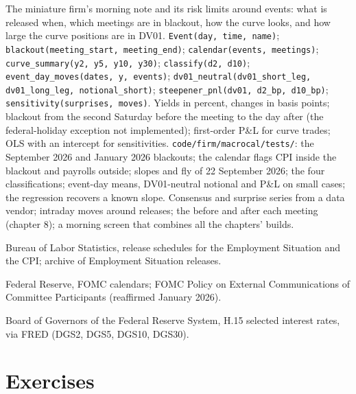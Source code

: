 \begin{build}
 The miniature firm's morning note and its risk limits around events: what
is released when, which meetings are in blackout, how the curve looks, and how large the
curve positions are in DV01.
 \texttt{Event(day, time, name)}; \texttt{blackout(meeting\_start,
meeting\_end)}; \texttt{calendar(events, meetings)}; \texttt{curve\_summary(y2, y5, y10,
y30)}; \texttt{classify(d2, d10)}; \texttt{event\_day\_moves(dates, y, events)};
\texttt{dv01\_neutral(dv01\_short\_leg, dv01\_long\_leg, notional\_short)};
\texttt{steepener\_pnl(dv01, d2\_bp, d10\_bp)}; \texttt{sensitivity(surprises, moves)}.
 Yields in percent, changes in basis points; blackout from the second Saturday
before the meeting to the day after (the federal-holiday exception not implemented);
first-order P\&L for curve trades; OLS with an intercept for sensitivities.
 \texttt{code/firm/macrocal/tests/}: the September 2026 and January
2026 blackouts; the calendar flags CPI inside the blackout and payrolls outside; slopes and
fly of 22 September 2026; the four classifications; event-day means, DV01-neutral notional
and  P\&L on small cases; the regression recovers a known slope.
 Consensus and surprise series from a data vendor; intraday moves around
releases; the  before and after each meeting (chapter 8); a morning
screen that combines all the chapters' builds.
\end{build}

\begin{omsources}
\item Bureau of Labor Statistics, release schedules for the Employment Situation and the
CPI; archive of Employment Situation releases.
\item Federal Reserve, FOMC calendars; FOMC Policy on External Communications of Committee
Participants (reaffirmed January 2026).
\item Board of Governors of the Federal Reserve System, H.15 selected interest rates, via
FRED (DGS2, DGS5, DGS10, DGS30).
\end{omsources}

\section{Exercises}

